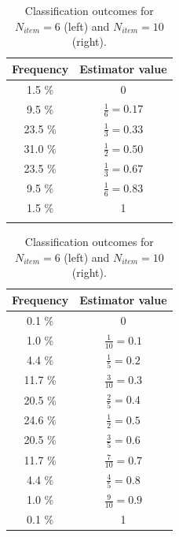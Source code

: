 \documentclass[a4paper,12pt]{article}
\begin{document}
\begin{table}
\parbox{.5\linewidth}{
\centering
\begin{tabular}{|cc|}
\hline
\textbf{Frequency} & \textbf{Estimator value} \\
\hline \hline
1.5 \%                            & 0                                \\
9.5 \%                            & $\frac{1}{6} = 0.17$                  \\
23.5 \%                           & $\frac{1}{3} = 0.33$                   \\
31.0 \%                             & $\frac{1}{2} = 0.50$                  \\
23.5 \%                           & $\frac{1}{3} = 0.67$                  \\
9.5 \%                            & $\frac{1}{6} = 0.83$                  \\
1.5 \%                            & 1  \\
\hline
\label{Table::probs}
\end{tabular}
\caption{Classification outcomes for $N_{item}=6$ (left) and $N_{item}=10$ (right).}
}
\hfill
\parbox{.5\linewidth}{
\centering
\begin{tabular}{|cc|}
\hline 
\textbf{Frequency} & \textbf{Estimator value} \\
\hline \hline
0.1 \%                            & 0                           \\
1.0 \%                            & $\frac{1}{10} = 0.1$              \\
4.4 \%                            & $\frac{1}{5} = 0.2$               \\
11.7 \%                           & $\frac{3}{10} = 0.3$              \\
20.5 \%                           & $\frac{2}{5} = 0.4$               \\
24.6 \%                           & $\frac{1}{2} = 0.5$               \\
20.5 \%                           & $\frac{3}{5} = 0.6$               \\
11.7 \%                           & $\frac{7}{10} = 0.7$              \\
4.4  \%                           & $\frac{4}{5} = 0.8$               \\
1.0  \%                           & $\frac{9}{10} = 0.9$              \\
0.1  \%                           & 1  \\
\hline
\end{tabular}
}
\end{table}
\end{document}
